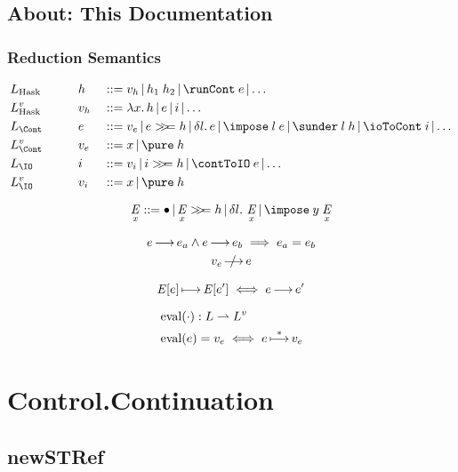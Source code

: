 \documentclass{report}
\begin{document}
\subsection{About: This Documentation} %

\subsubsection{Reduction Semantics}

\begin{alignat*}{3}
  &L_\Hask \quad\quad &&h   &&::=
    v_h \| h_1 \app h_2 \| \runCont \app e \| \ldots \\
  &L_\Hask^v          &&v_h &&::=
    \lam x h \| e \| i \| \ldots \\
  &L_\Cont &&e   &&::=
    v_e \| e \bind h \| \del l e \| \impose \app l \app e
        \| \sunder \app l \app h \| \ioToCont \app i \| \ldots \\
  &L_\Cont^v          &&v_e &&::=
    x \| \pure \app h \\
  &L_\IO              &&i   &&::=
    v_i \| i \bind h \| \contToIO \app e \| \ldots \\
  &L_\IO^v            &&v_i &&::=
    x \| \pure \app h
\end{alignat*}

\[
  \E_x ::= \hole
         \| \E_x \bind h
         \| \del l \E_x
         \| \impose \app y \app {\E_x}
\]

\begin{gather*}
  e \redAx e_a \wedge e \redAx e_b \implies e_a = e_b \\
  v_e \Not\redAx e
\end{gather*}

\[
  {\operatorname*{\mathit E}} {\left[e\right]} \operatorname*{\mathrel{\longmapsto}} {\operatorname*{\mathit E}} {\left[e'\right]} \iff e \operatorname*{\mathrel{\longrightarrow}} e'
\]

\begin{align*}
  &\operatorname*{\mathrm{eval}}(\cdot) : L \rightharpoonup L^v \\
  &\operatorname*{\mathrm{eval}}(e) = v_e \iff e \operatorname*{\mathrel{\longmapsto}}^* v_e
\end{align*}



\section{Control.Continuation} %

\subsection{newSTRef}
\end{document}
